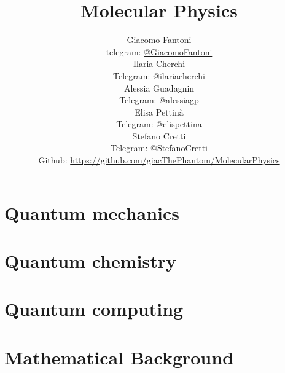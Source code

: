 

\title{\Huge \textbf{Molecular Physics}}

\author{
  Giacomo Fantoni \\
  \small telegram: \href{https://t.me/GiacomoFantoni}{@GiacomoFantoni} \\[3pt]
  Ilaria Cherchi\\
  \small Telegram: \href{https://t.me/ilariacherchi}{@ilariacherchi} \\[3pt]
  Alessia Guadagnin\\
  \small Telegram: \href{https://t.me/alessiagp}{@alessiagp} \\[3pt]
  Elisa Pettin\`a\\
  \small Telegram: \href{https://t.me/elisapettina}{@elispettina} \\[3pt]
  Stefano Cretti\\
  \small Telegram: \href{https://t.me/StefanoCretti}{@StefanoCretti} \\[3pt]
\small Github: \href{https://github.com/giacThePhantom/MolecularPhysics}{https://github.com/giacThePhantom/MolecularPhysics}}


\maketitle
\tableofcontents

  \part{Quantum mechanics}

    
    
    
    

  \part{Quantum chemistry}

    
    
    

  \part{Quantum computing}

   

  \part{Mathematical Background}

    
    
    
    
    
    
    
    


